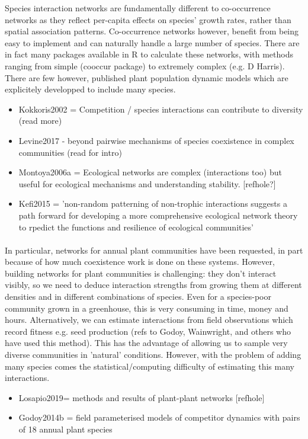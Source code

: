 \documentclass[a4,12pt]{article}
\begin{document}
    Species interaction networks are fundamentally different to co-occurrence networks as they reflect per-capita effects on species' growth rates, rather than spatial association patterns. 
    Co-occurrence networks however, benefit from being easy to implement and can naturally handle a large number of species. There are in fact many  packages available in R to calculate these networks, with methods ranging from simple (cooccur package) to extremely complex (e.g. D Harris). 
    There are few however, published plant population dynamic models which are explicitely developped to include many species.

    \begin{itemize}
        \item Kokkoris2002 =  Competition / species interactions can contribute to diversity (read more)
        \item Levine2017 - beyond pairwise mechanisms of species coexistence in complex communities (read for intro)
        \item  Montoya2006a = Ecological networks are complex (interactions too) but useful for ecological mechanisms and understanding stability. [refhole?]
        \item Kefi2015 = 'non-random patterning of non-trophic interactions suggests a path forward for developing a more comprehensive ecological network theory to rpedict the functions and resilience of ecological communities'
    \end{itemize}

    \paragraph{}
    In particular, networks for annual plant communities have been requested, in part because of how much coexistence work is done on these systems. However, building networks for plant communities is challenging: they don't interact visibly, so we need to deduce interaction strengths from growing them at different densities and in different combinations of species. Even for a species-poor community grown in a greenhouse, this is very consuming in time, money and hours. Alternatively, we can estimate interactions from field observations which record fitness e.g. seed production (refs to Godoy, Wainwright, and others who have used this method). This has the advantage of allowing us to sample very diverse communities in 'natural' conditions. However, with the problem of adding many species comes the statistical/computing difficulty of estimating this many interactions.
    \begin{itemize}
        \item Losapio2019= methods and results of plant-plant networks [refhole]
        \item Godoy2014b = field parameterised models of competitor dynamics with pairs of 18 annual plant species
    \end{itemize}
\end{document}
